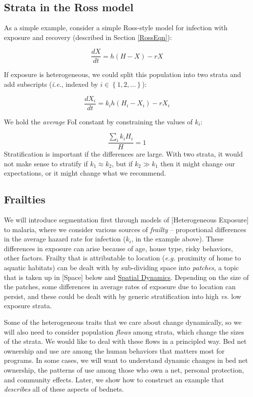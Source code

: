 \documentclass[
]{book}
\begin{document}
\subsection{Strata in the Ross model}\label{strata-in-the-ross-model}

As a simple example, consider a simple Ross-style model for infection with exposure and recovery (described in Section \ref{RossEqn}):

\[\frac{dX}{dt} = h (H-X)-r X\]

If exposure is heterogeneous, we could split this population into two strata and add subscripts (\emph{i.e.}, indexed by \(i \in \left\{1,2, \ldots \right\}\)):

\[\frac{dX_i}{dt} =  k_i h (H_i -X_i)-r X_i\]

We hold the \emph{average} FoI constant by constraining the values of \(k_i\):

\[\frac{\sum_i k_i H_i}{H} = 1\]
Stratification is important if the differences are large. With two strata, it would not make sense to stratify if \(k_1 \approx k_2\), but if \(k_2 \gg k_1\) then it might change our expectations, or it might change what we recommend.

\subsection{Frailties}\label{frailties}

We will introduce segmentation first through models of {[}Heterogeneous Exposure{]} to malaria, where we consider various sources of \emph{frailty} -- proportional differences in the average hazard rate for infection (\(k_i\), in the example above). These differences in exposure can arise because of age, house type, risky behaviors, other factors. Frailty that is attributable to location (\emph{e.g.} proximity of home to aquatic habitats) can be dealt with by sub-dividing space into \emph{patches,} a topic that is taken up in {[}Space{]} below and \hyperref[spatial-dynamics]{Spatial Dynamics}. Depending on the size of the patches, some differences in average rates of exposure due to location can persist, and these could be dealt with by generic stratification into high \emph{vs.} low exposure strata.

Some of the heterogeneous traits that we care about change dynamically, so we will also need to consider population \emph{flows} among strata, which change the sizes of the strata. We would like to deal with these flows in a principled way. Bed net ownership and use are among the human behaviors that matters most for programs. In some cases, we will want to understand dynamic changes in bed net ownership, the patterns of use among those who own a net, personal protection, and community effects. Later, we show how to construct an example that \emph{describes} all of these aspects of bednets.
\end{document}

